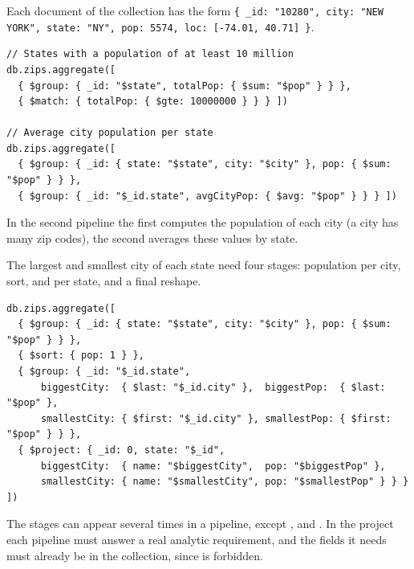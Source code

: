\begin{example}
Each document of the  collection has the form \texttt{\{ \_id: "10280", city: "NEW YORK", state: "NY", pop: 5574, loc: [-74.01, 40.71] \}}.
\begin{lstlisting}
// States with a population of at least 10 million
db.zips.aggregate([
  { $group: { _id: "$state", totalPop: { $sum: "$pop" } } },
  { $match: { totalPop: { $gte: 10000000 } } } ])

// Average city population per state
db.zips.aggregate([
  { $group: { _id: { state: "$state", city: "$city" }, pop: { $sum: "$pop" } } },
  { $group: { _id: "$_id.state", avgCityPop: { $avg: "$pop" } } } ])
\end{lstlisting}
In the second pipeline the first  computes the population of each city (a city has many zip codes), the second averages these values by state.

The largest and smallest city of each state need four stages: population per city, sort,  and  per state, and a final reshape.
\begin{lstlisting}
db.zips.aggregate([
  { $group: { _id: { state: "$state", city: "$city" }, pop: { $sum: "$pop" } } },
  { $sort: { pop: 1 } },
  { $group: { _id: "$_id.state",
      biggestCity:  { $last: "$_id.city" },  biggestPop:  { $last: "$pop" },
      smallestCity: { $first: "$_id.city" }, smallestPop: { $first: "$pop" } } },
  { $project: { _id: 0, state: "$_id",
      biggestCity:  { name: "$biggestCity",  pop: "$biggestPop" },
      smallestCity: { name: "$smallestCity", pop: "$smallestPop" } } } ])
\end{lstlisting}
\end{example}

\begin{remark}
The stages can appear several times in a pipeline, except ,  and . In the project each pipeline must answer a real analytic requirement, and the fields it needs must already be in the collection, since  is forbidden.
\end{remark}
